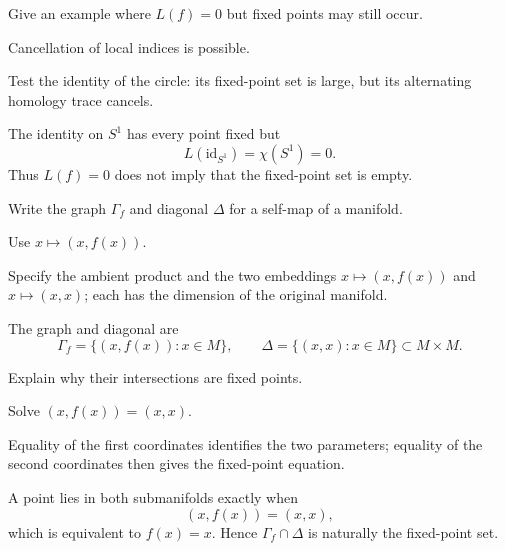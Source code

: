 \begin{exercise}\label{exr:viii35-09}
Give an example where $L(f)=0$ but fixed points may still occur.
\end{exercise}
\begin{hint}
Cancellation of local indices is possible.

Test the identity of the circle: its fixed-point set is large, but its alternating homology trace cancels.
\end{hint}
\begin{solution}
The identity on \(S^1\) has every point fixed but
\[
L(\mathrm{id}_{S^1})=\chi(S^1)=0.
\]
Thus \(L(f)=0\) does not imply that the fixed-point set is empty.
\end{solution}

\begin{exercise}\label{exr:viii35-10}
Write the graph $\Gamma_f$ and diagonal $\Delta$ for a self-map of a manifold.
\end{exercise}
\begin{hint}
Use $x\mapsto(x,f(x))$.

Specify the ambient product and the two embeddings \(x\mapsto(x,f(x))\) and \(x\mapsto(x,x)\); each has the dimension of the original manifold.
\end{hint}
\begin{solution}
The graph and diagonal are
\[
\Gamma_f=\{(x,f(x)):x\in M\},\qquad
\Delta=\{(x,x):x\in M\}\subset M\times M.
\]
\end{solution}

\begin{exercise}\label{exr:viii35-11}
Explain why their intersections are fixed points.
\end{exercise}
\begin{hint}
Solve $(x,f(x))=(x,x)$.

Equality of the first coordinates identifies the two parameters; equality of the second coordinates then gives the fixed-point equation.
\end{hint}
\begin{solution}
A point lies in both submanifolds exactly when
\[
(x,f(x))=(x,x),
\]
which is equivalent to \(f(x)=x\). Hence \(\Gamma_f\cap\Delta\) is naturally the fixed-point set.
\end{solution}

